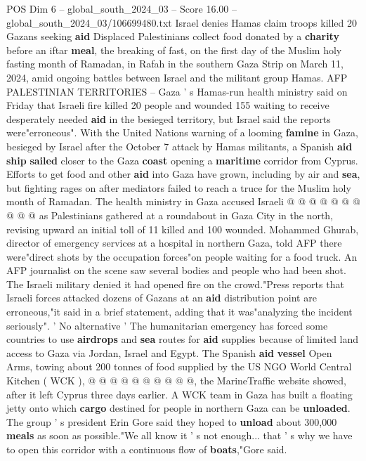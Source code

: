 \begin{textsample}{POS Dim 6 – global\_south\_2024\_03 – Score 16.00 – global\_south\_2024\_03/106699480.txt}  \label{ex:f6_pos_031}
Israel denies Hamas claim troops killed 20 Gazans seeking \textbf{aid} Displaced Palestinians collect food donated by a \textbf{charity} before an iftar \textbf{meal}, the breaking of fast, on the first day of the Muslim holy fasting month of Ramadan, in Rafah in the southern Gaza Strip on March 11, 2024, amid ongoing battles between Israel and the militant group Hamas.
AFP PALESTINIAN TERRITORIES -- Gaza ' s Hamas-run health ministry said on Friday that Israeli fire killed 20 people and wounded 155 waiting to receive desperately needed \textbf{aid} in the besieged territory, but Israel said the reports were"erroneous".
With the United Nations warning of a looming \textbf{famine} in Gaza, besieged by Israel after the October 7 attack by Hamas militants, a Spanish \textbf{aid} \textbf{ship} \textbf{sailed} closer to the Gaza \textbf{coast} opening a \textbf{maritime} corridor from Cyprus.
Efforts to get food and other \textbf{aid} into Gaza have grown, including by air and \textbf{sea}, but fighting rages on after mediators failed to reach a truce for the Muslim holy month of Ramadan.
The health ministry in Gaza accused Israeli @ @ @ @ @ @ @ @ @ @ as Palestinians gathered at a roundabout in Gaza City in the north, revising upward an initial toll of 11 killed and 100 wounded.
Mohammed Ghurab, director of emergency services at a hospital in northern Gaza, told AFP there were"direct shots by the occupation forces"on people waiting for a food truck.
An AFP journalist on the scene saw several bodies and people who had been shot.
The Israeli military denied it had opened fire on the crowd."Press reports that Israeli forces attacked dozens of Gazans at an \textbf{aid} distribution point are erroneous,"it said in a brief statement, adding that it was"analyzing the incident seriously". ' No alternative ' The humanitarian emergency has forced some countries to use \textbf{airdrops} and \textbf{sea} routes for \textbf{aid} supplies because of limited land access to Gaza via Jordan, Israel and Egypt.
The Spanish \textbf{aid} \textbf{vessel} Open Arms, towing about 200 tonnes of food supplied by the US NGO World Central Kitchen ( WCK ), @ @ @ @ @ @ @ @ @ @, the MarineTraffic website showed, after it left Cyprus three days earlier.
A WCK team in Gaza has built a floating jetty onto which \textbf{cargo} destined for people in northern Gaza can be \textbf{unloaded}.
The group ' s president Erin Gore said they hoped to \textbf{unload} about 300,000 \textbf{meals} as soon as possible."We all know it ' s not enough... that ' s why we have to open this corridor with a continuous flow of \textbf{boats},"Gore said.

\end{textsample}

